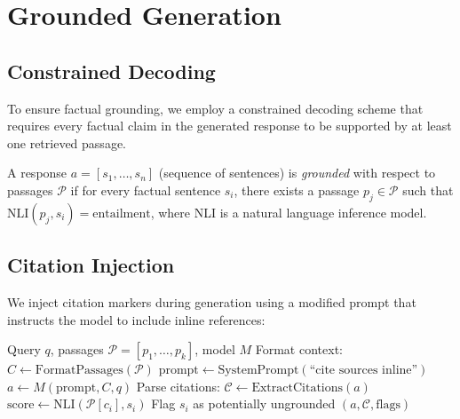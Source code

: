 \section{Grounded Generation}

\label{sec:generation}

\subsection{Constrained Decoding}

To ensure factual grounding, we employ a constrained decoding scheme that requires every factual claim in the generated response to be supported by at least one retrieved passage.

\begin{definition}
A response $a = [s_1, \ldots, s_n]$ (sequence of sentences) is \emph{grounded} with respect to passages $\mathcal{P}$ if for every factual sentence $s_i$, there exists a passage $p_j \in \mathcal{P}$ such that $\text{NLI}(p_j, s_i) = \text{entailment}$, where NLI is a natural language inference model.
\end{definition}

\subsection{Citation Injection}

We inject citation markers during generation using a modified prompt that instructs the model to include inline references:

\begin{algorithm}[H]
\caption{Grounded Generation with Citation Injection}
\label{alg:grounded}
\begin{algorithmic}[1]
\Require Query $q$, passages $\mathcal{P} = [p_1, \ldots, p_k]$, model $M$
\State Format context: $C \gets \text{FormatPassages}(\mathcal{P})$
\State $\text{prompt} \gets \text{SystemPrompt}(\text{``cite sources inline''})$
\State $a \gets M(\text{prompt}, C, q)$ 
\State Parse citations: $\mathcal{C} \gets \text{ExtractCitations}(a)$
\State {}
    \State $\text{score} \gets \text{NLI}(\mathcal{P}[c_i], s_i)$
        \State Flag $s_i$ as potentially ungrounded
    \EndIf
\EndFor
\State \Return $(a, \mathcal{C}, \text{flags})$
\end{algorithmic}
\end{algorithm}

